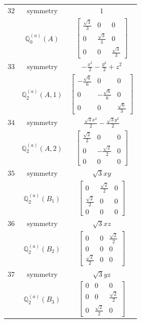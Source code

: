 \documentclass[fleqn,8pt,landscape]{jsarticle}
\begin{document}
\begin{longtable}{ccc}
$ 32 $ & $ \text{symmetry} $ & $ 1 $ \\
$  $ & $ \mathbb{Q}_{0}^{(a)}(A) $ & $ \begin{bmatrix} \frac{\sqrt{3}}{3} & 0 & 0 \\ 0 & \frac{\sqrt{3}}{3} & 0 \\ 0 & 0 & \frac{\sqrt{3}}{3} \end{bmatrix} $ \\ \hline
$ 33 $ & $ \text{symmetry} $ & $ - \frac{x^{2}}{2} - \frac{y^{2}}{2} + z^{2} $ \\
$  $ & $ \mathbb{Q}_{2}^{(a)}(A,1) $ & $ \begin{bmatrix} - \frac{\sqrt{6}}{6} & 0 & 0 \\ 0 & - \frac{\sqrt{6}}{6} & 0 \\ 0 & 0 & \frac{\sqrt{6}}{3} \end{bmatrix} $ \\ \hline
$ 34 $ & $ \text{symmetry} $ & $ \frac{\sqrt{3} x^{2}}{2} - \frac{\sqrt{3} y^{2}}{2} $ \\
$  $ & $ \mathbb{Q}_{2}^{(a)}(A,2) $ & $ \begin{bmatrix} \frac{\sqrt{2}}{2} & 0 & 0 \\ 0 & - \frac{\sqrt{2}}{2} & 0 \\ 0 & 0 & 0 \end{bmatrix} $ \\ \hline
$ 35 $ & $ \text{symmetry} $ & $ \sqrt{3} x y $ \\
$  $ & $ \mathbb{Q}_{2}^{(a)}(B_{1}) $ & $ \begin{bmatrix} 0 & \frac{\sqrt{2}}{2} & 0 \\ \frac{\sqrt{2}}{2} & 0 & 0 \\ 0 & 0 & 0 \end{bmatrix} $ \\ \hline
$ 36 $ & $ \text{symmetry} $ & $ \sqrt{3} x z $ \\
$  $ & $ \mathbb{Q}_{2}^{(a)}(B_{2}) $ & $ \begin{bmatrix} 0 & 0 & \frac{\sqrt{2}}{2} \\ 0 & 0 & 0 \\ \frac{\sqrt{2}}{2} & 0 & 0 \end{bmatrix} $ \\ \hline
$ 37 $ & $ \text{symmetry} $ & $ \sqrt{3} y z $ \\
$  $ & $ \mathbb{Q}_{2}^{(a)}(B_{3}) $ & $ \begin{bmatrix} 0 & 0 & 0 \\ 0 & 0 & \frac{\sqrt{2}}{2} \\ 0 & \frac{\sqrt{2}}{2} & 0 \end{bmatrix} $ \\ \hline

\end{longtable}
\end{document}
